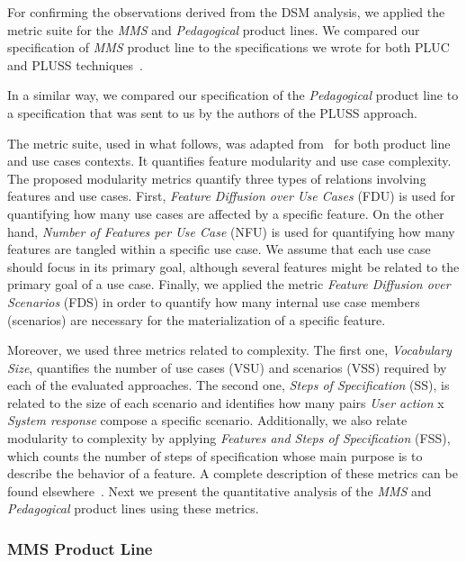 \documentclass{acm_proc_article-sp}
\begin{document}
For confirming the observations derived from the DSM analysis, we applied the metric suite for 
the \emph{MMS} and \emph{Pedagogical} product lines. We compared our specification of \emph{MMS} product line to the specifications we wrote for both PLUC and PLUSS techniques~\cite{spg-url}.  

In a similar way, we compared our specification of the \emph{Pedagogical} product line 
to a specification that was sent to us by the authors of the PLUSS approach. 

The metric suite, used in what follows, was adapted from~\cite{garcia-taosd-2005} for both product line 
and use cases contexts. It quantifies 
feature modularity and use case complexity. The proposed modularity 
metrics quantify three types of relations involving features and use cases.
First, \emph{Feature Diffusion over Use Cases} (FDU) is used for
quantifying how many use cases are affected by a specific
feature. On the other hand, \emph{Number of Features per Use Case} (NFU) is used for quantifying
how many features are tangled within a specific use
case. We assume that each use case should focus in
its primary goal, although several features might be related
to the primary goal of a use case. Finally, we applied
the metric \emph{Feature Diffusion over Scenarios} (FDS) in order
to quantify how many internal use case members (scenarios)
are necessary for the materialization of a specific feature.
 
Moreover, we used three metrics related to complexity.
The first one, \emph{Vocabulary Size}, quantifies the number of use
cases (VSU) and scenarios (VSS) required by each of the evaluated
approaches. The second one, \emph{Steps of Specification}
(SS), is related to the size of each scenario and identifies
how many pairs \emph{User action} x \emph{System response} compose a
specific scenario. Additionally, we also relate modularity to
complexity by applying \emph{Features and Steps of Specification}
(FSS), which counts the number of steps of specification
whose main purpose is to describe the behavior of a feature. 
A complete description of these metrics can be found elsewhere~\cite{rbonifacio-ea-2008}. Next we 
present the quantitative analysis of the \emph{MMS} and \emph{Pedagogical} product lines using these metrics.

\subsubsection{MMS Product Line}
\end{document}
